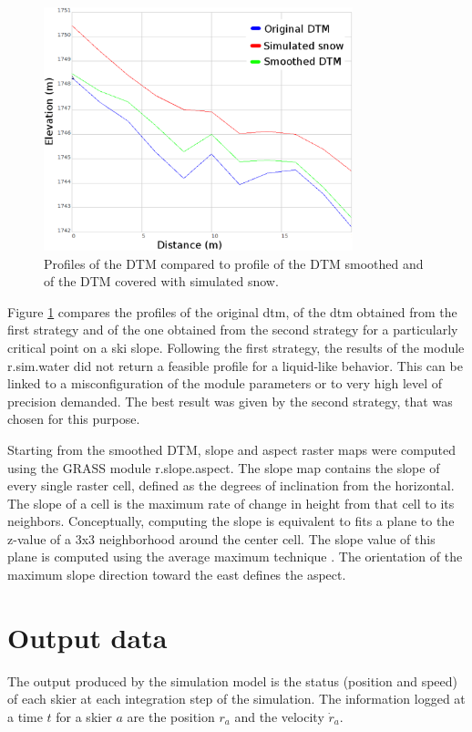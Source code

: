 \documentclass[12pt,a4paper,twoside]{book}
\begin{document}
\begin{figure}[!th]
  \centering
    \includegraphics[width=0.8\textwidth]{images/profiles_dtm.eps}
    \caption{Profiles of the DTM compared to profile of the DTM smoothed and of the DTM covered with simulated snow.}\label{profile_dtm}
\end{figure}

Figure \ref{profile_dtm} compares the profiles of the original dtm, of the dtm obtained from the first strategy and of the one obtained from the second strategy for a particularly critical point on a ski slope. Following the first strategy, the results of the module r.sim.water did not return a feasible profile for a liquid-like behavior. This can be linked to a misconfiguration of the module parameters or to very high level of precision demanded. The best result was given by the second strategy, that was chosen for this purpose.

Starting from the smoothed DTM, slope and aspect raster maps were computed using the GRASS module r.slope.aspect. The slope map contains the slope of every single raster cell, defined as the degrees of inclination from the horizontal. The slope of a cell is the maximum rate of change in height from that cell to its neighbors. Conceptually, computing the slope is equivalent to fits a plane to the z-value of a 3x3 neighborhood around the center cell. The slope value of this plane is computed using the average maximum technique \cite{bur2009}. The orientation of the maximum slope direction toward the east defines the aspect.

\section{Output data}\label{output_data}
The output produced by the simulation model is the status (position and speed) of each skier at each integration step of the simulation. The information logged at a time $t$ for a skier $a$ are the position $r_a$ and the velocity $\dot{r}_a$.
\end{document}
